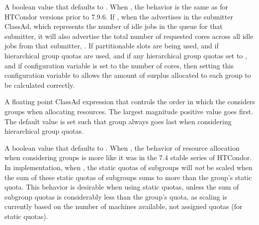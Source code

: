 \begin{description}
\label{param:NegotiatorUseWeightedDemand}
\item[\Macro{NEGOTIATOR\_USE\_WEIGHTED\_DEMAND}]
  A boolean value that defaults to . 
  When , the behavior is the same as for HTCondor versions
  prior to 7.9.6.
  If , when the  advertises 
  in the submitter ClassAd,
  which represents the number of idle jobs in the queue for that submitter,
  it will also advertise the total number of requested cores across
  all idle jobs from that submitter, .
  If partitionable slots are being used,
  and if hierarchical group quotas are used,
  and if any hierarchical group quotas set 
  to ,
  and if configuration variable  is set to 
  the number of cores,
  then setting this configuration variable to  allows
  the amount of surplus allocated to each group to be calculated correctly. 

\label{param:GroupSortExpr}
\item[\Macro{GROUP\_SORT\_EXPR}]
  A floating point ClassAd expression that controls the order in which the 
   considers groups when allocating resources.
  The largest magnitude positive value goes first.
  The default value is set such that group  always
  goes last when considering hierarchical group quotas.

\label{param:NegotiatorAllowQuotaOversubscription}
\item[\Macro{NEGOTIATOR\_ALLOW\_QUOTA\_OVERSUBSCRIPTION}]
  A boolean value that defaults to .
  When , 
  the behavior of resource allocation when considering groups is
  more like it was in the 7.4 stable series of HTCondor.
  In implementation, when , the static quotas of subgroups
  will \emph{not} be scaled when the sum of these static quotas of subgroups
  sums to more than the group's static quota.
  This behavior is desirable when using static quotas,
  unless the sum of subgroup quotas is considerably less than the group's
  quota, as scaling is currently based on the number of machines available,
  not assigned quotas (for static quotas).

\end{description}


